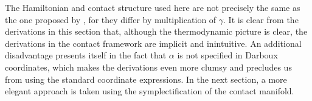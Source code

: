 The Hamiltonian and contact structure used here are not precisely the same as the one proposed by \citet{Bravetti2017}, for they differ by multiplication of $\gamma$. It is clear from the derivations in this section that, although the thermodynamic picture is clear, the derivations in the contact framework are implicit and inintuitive. An additional disadvantage presents itself in the fact that $\alpha$ is not specified in Darboux coordinates, which makes the derivations even more clumsy and precludes us from using the standard coordinate expressions. In the next section, a more elegant approach is taken using the symplectification of the contact manifold.

